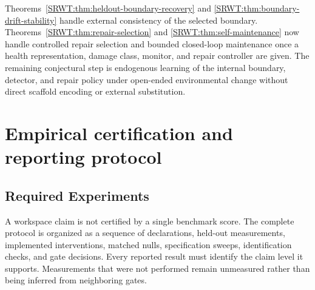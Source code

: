 Theorems~\ref{SRWT:thm:heldout-boundary-recovery} and
\ref{SRWT:thm:boundary-drift-stability} handle external consistency of the selected
boundary. Theorems~\ref{SRWT:thm:repair-selection} and
\ref{SRWT:thm:self-maintenance} now handle controlled repair selection and bounded
closed-loop maintenance once a health representation, damage class, monitor,
and repair controller are given. The remaining conjectural step is endogenous
learning of the internal boundary, detector, and repair policy under open-ended
environmental change without direct scaffold encoding or external
substitution.


\chapter{Empirical certification and reporting protocol}\label{SRWT:book:chapter-87}


\section{Required Experiments}

A workspace claim is not certified by a single benchmark score. The complete
protocol is organized as a sequence of declarations, held-out measurements,
implemented interventions, matched nulls, specification sweeps, identification
checks, and gate decisions. Every reported
result must identify the claim level it supports. Measurements that were not
performed remain unmeasured rather than being inferred from neighboring gates.


